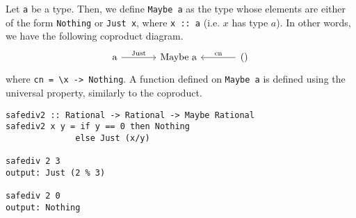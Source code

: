 \documentclass[11pt]{article}
\theoremstyle{nonumberplain}
\newcommand*\lsin{\lstinline}
\newcommand*\lsmath[1]{\text{\lstinline|#1|}}
\begin{document}
Let \lsin|a| be a type. Then, we define \lsin|Maybe a| as the type whose elements are either of the form \lsin|Nothing| or \lsin|Just x|, where \lsin|x :: a| (i.e. $x$ has type $a$). In other words, we have the following coproduct diagram.
\begin{equation}
\begin{tikzcd}[column sep = large]
\lsmath{a} \arrow[r, "\lsmath{Just}"] & \lsmath{Maybe a} & \lsmath{()} \arrow[l, "\lsmath{cn}"']
\end{tikzcd}
\end{equation}
where \lsin|cn = \x -> Nothing|. A function defined on \lsin|Maybe a| is defined using the universal property, similarly to the coproduct.
\begin{lstlisting}
safediv2 :: Rational -> Rational -> Maybe Rational
safediv2 x y = if y == 0 then Nothing
              else Just (x/y)
              
safediv 2 3
output: Just (2 % 3)

safediv 2 0
output: Nothing
\end{lstlisting}




\end{document}
